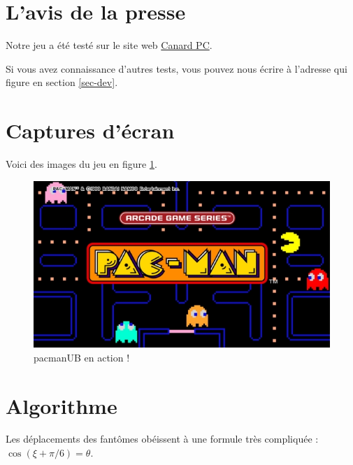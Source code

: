 \documentclass[11pt]{article}
\begin{document}
\section{L'avis de la presse}
\label{sec:orga147540}
Notre jeu a été testé sur le site web \href{https://www.canardpc.com}{Canard PC}.

Si vous avez connaissance d'autres tests, vous pouvez nous écrire à l'adresse qui figure en section \ref{sec-dev}.

\section{Captures d'écran}
\label{sec:org5e0747f}
Voici des images du jeu en figure \ref{fig-capture}.

\begin{figure}[htbp]
\centering
\includegraphics[width=.9\linewidth]{./pacman.jpg}
\caption{pacmanUB en action ! \label{fig-capture}}
\end{figure}

\section{Algorithme}
\label{sec:org8f7fcfe}
Les déplacements des fantômes obéissent à une formule très compliquée : \(\cos(\xi + \pi/6) = \theta\).
\end{document}
